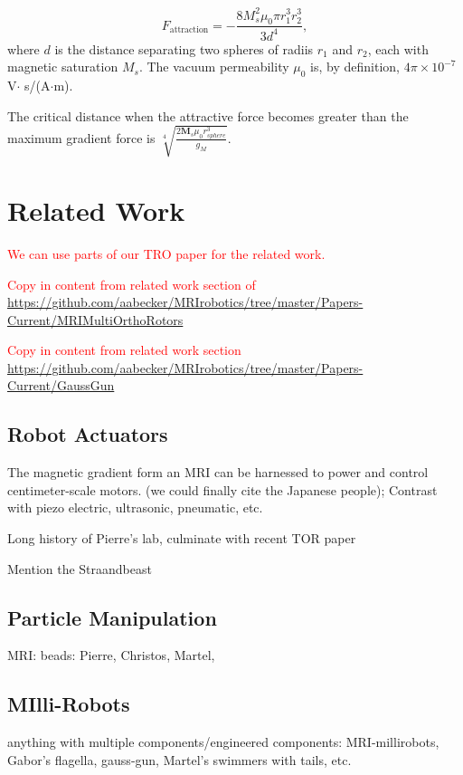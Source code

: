 \documentclass[graybox,usenames]{svmult}
\newcommand{\todo}[1]{\textcolor{red}{\footnotesize \textsf{#1}}}
\begin{document}
\begin{equation}
F_{\text{attraction}} = -\frac{ 8 M_{s}^2 \mu_0 \pi  r^3_1 r^3_2 }{3 d^4},
\label{eq:attractionForce}
\end{equation}
where $d$ is the distance separating two spheres of radiis $r_1$ and $r_2$, each with magnetic saturation $M_{s}$. 
The vacuum permeability $\mu_0$ is, by definition, $4 \pi\times 10^{-7}$ V$\cdot$ s/(A$\cdot$m).

The critical distance when the attractive force becomes greater than the maximum gradient force is $\sqrt[4]{\frac{2  \mathbf{M}_s \mu_0 r^3_{sphere} }{g_{M}}}. $  

\section{Related Work}\label{sec:relatedwork}

\todo{We can use parts of our TRO paper for the related work.}


\todo{ Copy in content from related work section of \url{https://github.com/aabecker/MRIrobotics/tree/master/Papers-Current/MRIMultiOrthoRotors } }

\todo{ Copy in content from related work section \url{https://github.com/aabecker/MRIrobotics/tree/master/Papers-Current/GaussGun  } }


\subsection{Robot Actuators}
The magnetic gradient form an MRI can be harnessed to power and control centimeter-scale motors.
 (we could finally cite the Japanese people); Contrast with piezo electric, ultrasonic, pneumatic, etc.
 
 Long history of Pierre's lab, culminate with recent TOR paper
 
 Mention the Straandbeast
 
 
 \subsection{Particle Manipulation}
MRI: beads: Pierre, Christos, Martel,


\subsection{MIlli-Robots}
 anything with multiple components/engineered components:
MRI-millirobots, Gabor's flagella, gauss-gun, Martel's swimmers with tails, etc.
\end{document}
